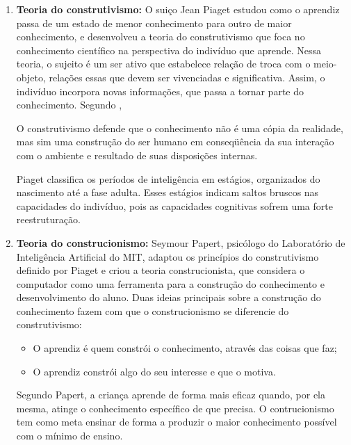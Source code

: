 \begin{enumerate}
\item \textbf{Teoria do construtivismo:} O suiço Jean Piaget estudou como o aprendiz passa de um estado de menor conhecimento para outro de maior conhecimento, e desenvolveu a teoria do construtivismo que foca no conhecimento científico na perspectiva do indivíduo que aprende. Nessa teoria, o sujeito é um ser ativo que estabelece relação de troca com o meio-objeto, relações essas que devem ser vivenciadas e significativa. Assim, o indivíduo incorpora novas informações, que passa a tornar parte do conhecimento. Segundo \cite{zilli2004robotica}, 

\begin{citacao}
O construtivismo defende que o conhecimento não é uma cópia da realidade, mas sim
uma construção do ser humano em conseqüência da sua interação com o ambiente e resultado de suas disposições internas.
\end{citacao} 

Piaget classifica os períodos de inteligência em estágios, organizados do nascimento até a fase adulta. Esses estágios indicam saltos bruscos nas capacidades do indivíduo, pois as capacidades cognitivas sofrem uma forte reestruturação.

\item \textbf{Teoria do construcionismo:} Seymour Papert, psicólogo do Laboratório de Inteligência Artificial do MIT, adaptou os princípios do construtivismo definido por Piaget e criou a teoria construcionista, que considera o computador como uma ferramenta para a construção do conhecimento e desenvolvimento do aluno. Duas ideias principais sobre a construção do conhecimento fazem com que o construcionismo se diferencie do construtivismo:
\begin{itemize}
\item O aprendiz é quem constrói o conhecimento, através das coisas que faz;
\item O aprendiz constrói algo do seu interesse e que o motiva. 
\end{itemize} 
Segundo Papert, a criança aprende de forma mais eficaz quando, por ela mesma, atinge o conhecimento específico de que precisa. O contrucionismo tem como meta ensinar de forma a produzir o maior conhecimento possível com o mínimo de ensino.
\end{enumerate}

